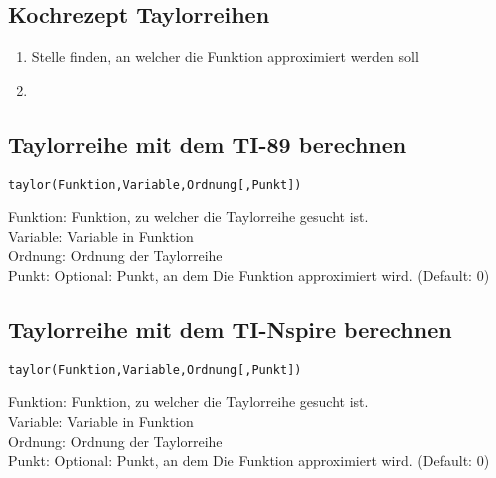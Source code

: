 \subsection{Kochrezept Taylorreihen}
\begin{enumerate}
  \item Stelle finden, an welcher die Funktion approximiert werden soll
  \item 
\end{enumerate}

\ifti
\subsection{Taylorreihe mit dem TI-89 berechnen}
\begin{verbatim}
taylor(Funktion,Variable,Ordnung[,Punkt])
\end{verbatim}
Funktion: Funktion, zu welcher die Taylorreihe gesucht ist. \\
Variable: Variable in Funktion\\
Ordnung: Ordnung der Taylorreihe\\
Punkt: Optional: Punkt, an dem Die Funktion approximiert wird. (Default: 0)
\fi
\ifnspire
\subsection{Taylorreihe mit dem TI-Nspire berechnen}
\begin{verbatim}
taylor(Funktion,Variable,Ordnung[,Punkt])
\end{verbatim}
Funktion: Funktion, zu welcher die Taylorreihe gesucht ist. \\
Variable: Variable in Funktion\\
Ordnung: Ordnung der Taylorreihe\\
Punkt: Optional: Punkt, an dem Die Funktion approximiert wird. (Default: 0)
\fi
